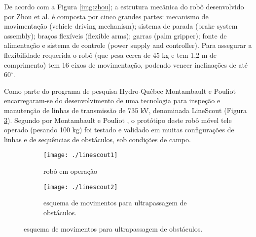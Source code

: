 De acordo com a Figura \ref{img:zhou}; a estrutura mecânica do robô desenvolvido por Zhou et al. \cite{zhou2005control} é composta por cinco grandes partes: mecanismo de movimentação (vehicle driving mechanism); sistema de parada (brake system assembly); braços flexíveis (flexible arms); garras (palm gripper); fonte de alimentação e sistema de controle (power supply and controller). Para assegurar a flexibilidade requerida o robô (que pesa cerca de 45 kg e tem 1,2 m de comprimento) tem 16 eixos de movimentação, podendo vencer inclinações de até 60$^{\circ}$. 

Como parte do programa de pesquisa Hydro-Québec Montambault e Pouliot \cite{montambault2007design} encarregaram-se do desenvolvimento de uma tecnologia para inspeção e manutenção de linhas de transmissão de 735 kV, denominada LineScout (Figura \ref{fig:linescout}). Segundo por Montambault e Pouliot \cite{montambault2007design}, o protótipo deste robô móvel tele operado (pesando 100 kg) foi testado e validado em muitas configurações de linhas e de sequências de obstáculos, sob condições de campo.

\begin{figure}[h!]
		\caption{Robô LineScout.}
		\begin{subfigure}[b]{0.5\textwidth}
		  	\centering
		  	\texttt{[image: ./linescout1]} 
		  	\caption{robô em operação}
		  	\label{fig:linescout1}
		\end{subfigure} 
		\begin{subfigure}[b]{0.5\textwidth}
		  	\centering
		  	\texttt{[image: ./linescout2]} 
		  	\caption{esquema de movimentos para ultrapassagem de obstáculos.}
		  	\label{fig:linescout2}
		\end{subfigure} 
	  \label{fig:linescout}
\end{figure}

